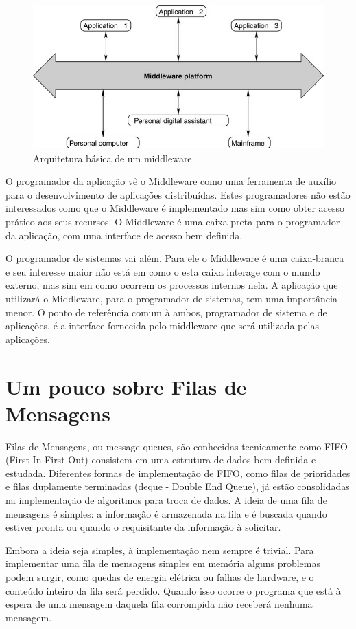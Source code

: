 \documentclass[12pt]{article}
\begin{document}
\begin{figure}[ht]
\centering
\includegraphics[width=.5\textwidth]{Img_Middleware_Arc.png}
\caption{Arquitetura básica de um middleware}
\label{fig:exampleFig1}
\end{figure}

O programador da aplicação vê o Middleware como uma ferramenta de auxílio para o
desenvolvimento de aplicações distribuídas. Estes programadores não estão interessados
como que o Middleware é implementado mas sim como obter acesso prático aos seus recursos. O Middleware é
uma caixa-preta para o programador da aplicação, com uma interface de acesso bem definida.

O programador de sistemas vai além. Para ele o Middleware é uma caixa-branca e seu
interesse maior não está em como o esta caixa interage com o mundo externo, mas sim em
como ocorrem os processos internos nela. A aplicação que utilizará o Middleware, para o
programador de sistemas, tem uma importância menor. O ponto de referência comum à ambos,
programador de sistema e de aplicações, é a interface fornecida pelo middleware que será
utilizada pelas aplicações.

\section{Um pouco sobre Filas de Mensagens}
Filas de Mensagens, ou message queues, são conhecidas tecnicamente como FIFO (First In First Out) consistem
em uma estrutura de dados bem definida e estudada. Diferentes formas de implementação de FIFO, como filas de 
prioridades e filas duplamente terminadas (deque - Double End Queue), já estão consolidadas na implementação
de algoritmos para troca de dados. A ideia de uma fila de mensagens é simples: a informação é armazenada na 
fila e é buscada quando estiver pronta ou quando o requisitante da informação à solicitar.

Embora a ideia seja simples, à implementação nem sempre é trivial. Para implementar uma fila de mensagens simples
em memória alguns problemas podem surgir, como quedas de energia elétrica ou falhas de hardware, e o conteúdo 
inteiro da fila será perdido. Quando isso ocorre o programa que está à espera de uma mensagem daquela fila 
corrompida não receberá nenhuma mensagem.
\end{document}
